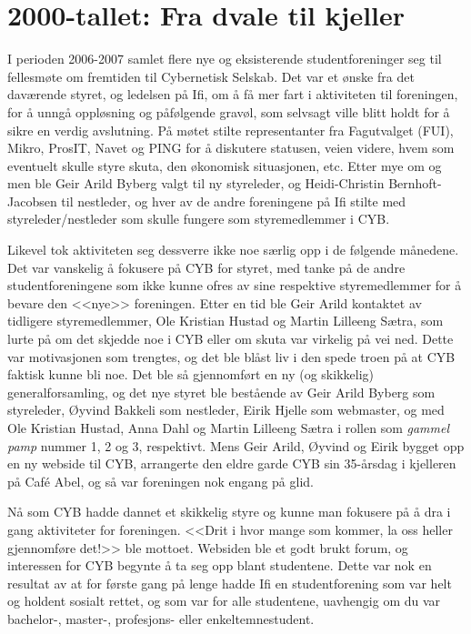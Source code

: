 \chapter[Fra dvale til kjeller]{2000-tallet: Fra dvale til kjeller}

\author{Skrevet av Geir Arild Byberg}

I perioden 2006-2007 samlet flere nye og eksisterende studentforeninger seg til fellesmøte om fremtiden til Cybernetisk Selskab. Det var et ønske fra det daværende styret, og ledelsen på Ifi, om å få mer fart i aktiviteten til foreningen, for å unngå oppløsning og påfølgende gravøl, som selvsagt ville blitt holdt for å sikre en verdig avslutning. På møtet stilte representanter fra Fagutvalget (FUI), Mikro, ProsIT, Navet og PING for å diskutere statusen, veien videre, hvem som eventuelt skulle styre skuta, den økonomisk situasjonen, etc. Etter mye om og men ble Geir Arild Byberg valgt til ny styreleder, og Heidi-Christin Bernhoft-Jacobsen til nestleder, og hver av de andre foreningene på Ifi stilte med styreleder\slash nestleder som skulle fungere som styremedlemmer i CYB.

Likevel tok aktiviteten seg dessverre ikke noe særlig opp i de følgende månedene. Det var vanskelig å fokusere på CYB for styret, med tanke på de andre studentforeningene som ikke kunne ofres av sine respektive styremedlemmer for å bevare den <<nye>> foreningen. Etter en tid ble Geir Arild kontaktet av tidligere styremedlemmer, Ole Kristian Hustad og Martin Lilleeng Sætra, som lurte på om det skjedde noe i CYB eller om skuta var virkelig på vei ned. Dette var motivasjonen som trengtes, og det ble blåst liv i den spede troen på at CYB faktisk kunne bli noe. Det ble så gjennomført en ny (og skikkelig) generalforsamling, og det nye styret ble bestående av Geir Arild Byberg som styreleder, Øyvind Bakkeli som nestleder, Eirik Hjelle som webmaster, og med Ole Kristian Hustad, Anna Dahl og Martin Lilleeng Sætra i rollen som \textit{gammel pamp} nummer 1, 2 og 3, respektivt. Mens Geir Arild, Øyvind og Eirik bygget opp en ny webside til CYB, arrangerte den eldre garde CYB sin 35-årsdag i kjelleren på Café Abel, og så var foreningen nok engang på glid.

Nå som CYB hadde dannet et skikkelig styre og kunne man fokusere på å dra i gang aktiviteter for foreningen. <<Drit i hvor mange som kommer, la oss heller gjennomføre det!>> ble mottoet. Websiden ble et godt brukt forum, og interessen for CYB begynte å ta seg opp blant studentene. Dette var nok en resultat av at for første gang på lenge hadde Ifi en studentforening som var helt og holdent sosialt rettet, og som var for alle studentene, uavhengig om du var bachelor-, master-, profesjons- eller enkeltemnestudent.

